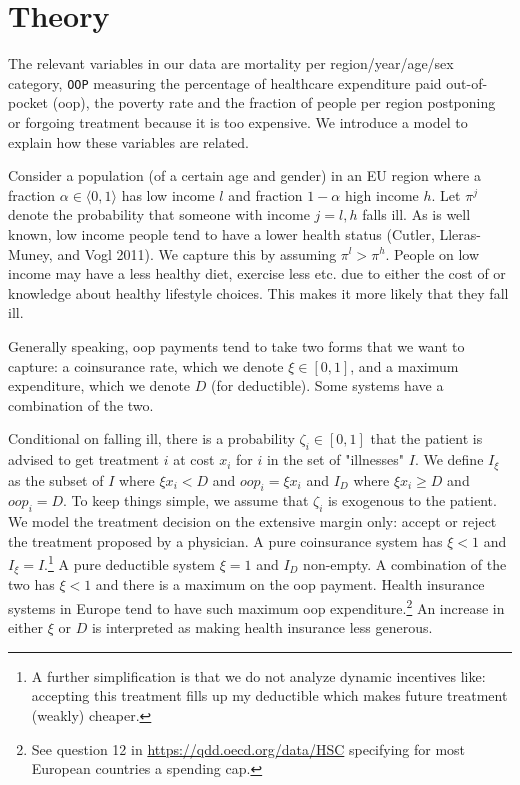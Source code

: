 \documentclass[a4paper,12pt]{article}
\makeatletter
\newcommand{\citeprocitem}[2]{\hyper@linkstart{cite}{citeproc_bib_item_#1}#2\hyper@linkend}
\makeatother
\begin{document}
\section{Theory}
\label{sec:org0aeb9d3}

The relevant variables in our data are mortality per region/year/age/sex category, \texttt{OOP} measuring the percentage of healthcare expenditure paid out-of-pocket (oop), the poverty rate and the fraction of people per region postponing or forgoing treatment because it is too expensive. We introduce a model to explain how these variables are related.

Consider a population (of a certain age and gender) in an EU region where a fraction \(\alpha \in \langle 0,1 \rangle\) has low income \(l\) and fraction \(1-\alpha\) high income \(h\). Let \(\pi^j\) denote the probability that someone with income \(j=l,h\) falls ill. As is well known, low income people tend to have a lower health status (\citeprocitem{9}{Cutler, Lleras-Muney, and Vogl 2011}). We capture this by assuming \(\pi^l > \pi^h\). People on low income may have a less healthy diet, exercise less etc. due to either the cost of or knowledge about healthy lifestyle choices. This makes it more likely that they fall ill.

Generally speaking, oop payments tend to take two forms that we want to capture: a coinsurance rate, which we denote \(\xi \in [0,1]\), and a maximum expenditure, which we denote \(D\) (for deductible). Some systems have a combination of the two.

Conditional on falling ill, there is a probability \(\zeta_i \in [0,1]\) that the patient is advised to get treatment \(i\) at cost \(x_i\) for \(i\) in the set of "illnesses" \(I\). We define \(I_{\xi}\) as the subset of \(I\) where \(\xi x_i < D\) and \(oop_i = \xi x_i\) and \(I_D\) where \(\xi x_i \geq D\) and \(oop_i = D\). To keep things simple, we assume that \(\zeta_i\) is exogenous to the patient. We model the treatment decision on the extensive margin only: accept or reject the treatment proposed by a physician. A pure coinsurance system has \(\xi < 1\) and \(I_{\xi}=I\).\footnote{A further simplification is that we do not analyze dynamic incentives like: accepting this treatment fills up my deductible which makes future treatment (weakly) cheaper.} A pure deductible system \(\xi=1\) and \(I_D\) non-empty. A combination of the two has \(\xi<1\) and there is a maximum on the oop payment. Health insurance systems in Europe tend to have such maximum oop expenditure.\footnote{See question 12 in \url{https://qdd.oecd.org/data/HSC} specifying for most European countries a spending cap.} An increase in either \(\xi\) or \(D\) is interpreted as making health insurance less generous.
\end{document}
